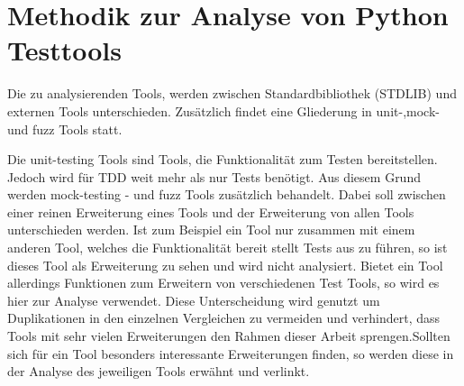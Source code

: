 \section{Methodik zur Analyse von Python Testtools}\label{methodik}
Die zu analysierenden Tools, werden zwischen Standardbibliothek (STDLIB) und 
externen Tools unterschieden. Zusätzlich findet eine Gliederung in 
unit-,\gls{mock}- und \gls{fuzz} Tools statt.

Die unit-testing Tools sind Tools, die Funktionalität zum Testen bereitstellen.
Jedoch wird für TDD weit mehr als nur Tests benötigt. Aus diesem Grund werden
\gls{mock}-testing - und \gls{fuzz} Tools zusätzlich behandelt. Dabei soll
zwischen einer reinen Erweiterung eines Tools und der Erweiterung von allen
Tools unterschieden werden. Ist zum Beispiel ein Tool nur zusammen mit einem
anderen Tool, welches die Funktionalität bereit stellt Tests aus zu führen,
so ist dieses Tool als Erweiterung zu sehen und wird nicht analysiert. Bietet
ein Tool allerdings Funktionen zum Erweitern von verschiedenen Test Tools, so
wird es hier zur  Analyse verwendet. Diese Unterscheidung wird genutzt um
Duplikationen in den einzelnen Vergleichen zu vermeiden und verhindert, dass
Tools mit sehr vielen Erweiterungen den Rahmen dieser Arbeit sprengen.Sollten
sich für ein Tool besonders interessante Erweiterungen finden, so werden diese
in der Analyse des jeweiligen Tools erwähnt und verlinkt.
\newline


